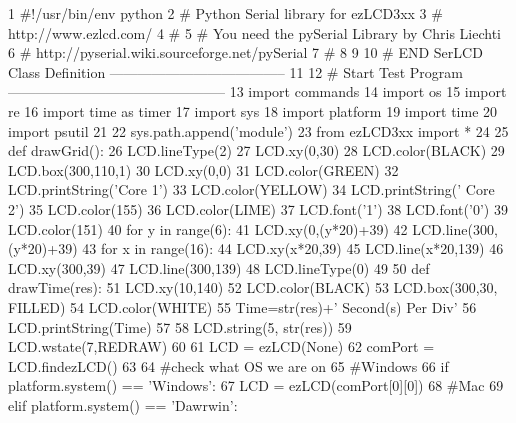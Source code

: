 \begin{DoxyCodeInclude}
1 \textcolor{comment}{#!/usr/bin/env python}
2 \textcolor{comment}{# Python Serial library for ezLCD3xx}
3 \textcolor{comment}{# http://www.ezlcd.com/}
4 \textcolor{comment}{#}
5 \textcolor{comment}{# You need the pySerial Library by Chris Liechti}
6 \textcolor{comment}{# http://pyserial.wiki.sourceforge.net/pySerial}
7 \textcolor{comment}{#}
8 
9 
10 \textcolor{comment}{# END SerLCD Class Definition --------------------------------------}
11 
12 \textcolor{comment}{# Start Test Program -----------------------------------------------}
13 \textcolor{keyword}{import} commands
14 \textcolor{keyword}{import} os
15 \textcolor{keyword}{import} re
16 \textcolor{keyword}{import} time \textcolor{keyword}{as} timer
17 \textcolor{keyword}{import} sys
18 \textcolor{keyword}{import} platform
19 \textcolor{keyword}{import} time
20 \textcolor{keyword}{import} psutil
21     
22 sys.path.append(\textcolor{stringliteral}{'module'}) 
23 \textcolor{keyword}{from} ezLCD3xx \textcolor{keyword}{import} *
24 
25 \textcolor{keyword}{def }drawGrid():
26     LCD.lineType(2)
27     LCD.xy(0,30)
28     LCD.color(BLACK)
29     LCD.box(300,110,1)
30     LCD.xy(0,0)
31     LCD.color(GREEN)
32     LCD.printString(\textcolor{stringliteral}{'Core 1'})
33     LCD.color(YELLOW)
34     LCD.printString(\textcolor{stringliteral}{'  Core 2'})
35     LCD.color(155)
36     LCD.color(LIME)
37     LCD.font(\textcolor{stringliteral}{'1'})
38     LCD.font(\textcolor{stringliteral}{'0'})
39     LCD.color(151)
40     \textcolor{keywordflow}{for} y \textcolor{keywordflow}{in} range(6):
41         LCD.xy(0,(y*20)+39)
42         LCD.line(300,(y*20)+39)
43     \textcolor{keywordflow}{for} x \textcolor{keywordflow}{in} range(16):
44         LCD.xy(x*20,39)
45         LCD.line(x*20,139)
46     LCD.xy(300,39)
47     LCD.line(300,139)
48     LCD.lineType(0)
49     
50 \textcolor{keyword}{def }drawTime(res):
51     LCD.xy(10,140)
52     LCD.color(BLACK)
53     LCD.box(300,30, FILLED)
54     LCD.color(WHITE)
55     Time=str(res)+\textcolor{stringliteral}{' Second(s) Per Div'}
56     LCD.printString(Time)
57 
58     LCD.string(5, str(res))
59     LCD.wstate(7,REDRAW)
60 
61 LCD = ezLCD(\textcolor{keywordtype}{None}) 
62 comPort =  LCD.findezLCD()
63 
64 \textcolor{comment}{#check what OS we are on}
65 \textcolor{comment}{#Windows}
66 \textcolor{keywordflow}{if} platform.system() == \textcolor{stringliteral}{'Windows'}:
67     LCD = ezLCD(comPort[0][0])
68 \textcolor{comment}{#Mac}
69 \textcolor{keywordflow}{elif} platform.system() == \textcolor{stringliteral}{'Dawrwin'}:

\end{DoxyCodeInclude}
